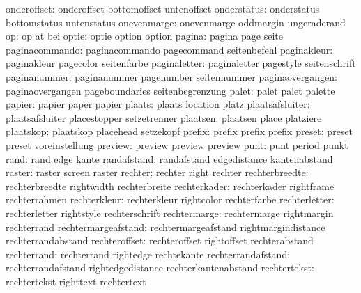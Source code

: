         onderoffset:  onderoffset          bottomoffset        untenoffset
        onderstatus:  onderstatus          bottomstatus        untenstatus
        onevenmarge:  onevenmarge          oddmargin           ungeraderand
                 op:  op                   at                  bei
              optie:  optie                option              option
             pagina:  pagina               page                seite
     paginacommando:  paginacommando       pagecommand         seitenbefehl
        paginakleur:  paginakleur          pagecolor           seitenfarbe
       paginaletter:  paginaletter         pagestyle           seitenschrift
       paginanummer:  paginanummer         pagenumber          seitennummer
   paginaovergangen:  paginaovergangen     pageboundaries      seitenbegrenzung
              palet:  palet                palet               palette
             papier:  papier               paper               papier
             plaats:  plaats               location            platz
    plaatsafsluiter:  plaatsafsluiter      placestopper        setzetrenner
           plaatsen:  plaatsen             place               platziere
          plaatskop:  plaatskop            placehead           setzekopf
             prefix:  prefix               prefix              prefix
             preset:  preset               preset              voreinstellung
            preview:  preview              preview             preview
               punt:  punt                 period              punkt
               rand:  rand                 edge                kante
        randafstand:  randafstand          edgedistance        kantenabstand
             raster:  raster               screen              raster
            rechter:  rechter              right               rechter
     rechterbreedte:  rechterbreedte       rightwidth          rechterbreite
       rechterkader:  rechterkader         rightframe          rechterrahmen
       rechterkleur:  rechterkleur         rightcolor          rechterfarbe
      rechterletter:  rechterletter        rightstyle          rechterschrift
       rechtermarge:  rechtermarge         rightmargin         rechterrand
rechtermargeafstand:  rechtermargeafstand  rightmargindistance rechterrandabstand
      rechteroffset:  rechteroffset        rightoffset         rechterabstand
        rechterrand:  rechterrand          rightedge           rechtekante
 rechterrandafstand:  rechterrandafstand   rightedgedistance   rechterkantenabstand
       rechtertekst:  rechtertekst         righttext           rechtertext
